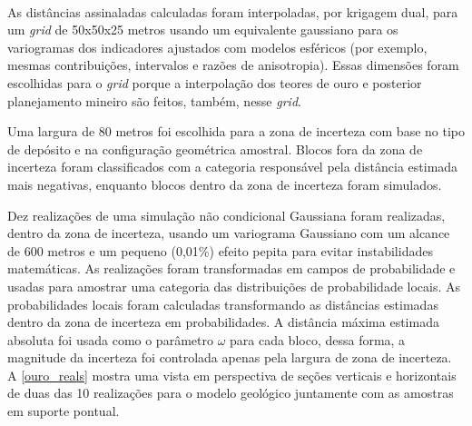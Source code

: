 \begin{figure}[H]
    \hspace{1em}
     \\
\end{figure}

As distâncias assinaladas calculadas foram interpoladas, por krigagem dual, para um \textit{grid} de 50x50x25 metros usando um equivalente gaussiano para os variogramas dos indicadores ajustados com modelos esféricos (por exemplo, mesmas contribuições, intervalos e razões de anisotropia). Essas dimensões foram escolhidas para o \textit{grid} porque a interpolação dos teores de ouro e posterior planejamento mineiro são feitos, também, nesse \textit{grid}.

Uma largura de 80 metros foi escolhida para a zona de incerteza com base no tipo de depósito e na configuração geométrica amostral. Blocos fora da zona de incerteza foram classificados com a categoria responsável pela distância estimada mais negativas, enquanto blocos dentro da zona de incerteza foram simulados.

Dez realizações de uma simulação não condicional Gaussiana foram realizadas, dentro da zona de incerteza, usando um variograma Gaussiano com um alcance de 600 metros e um pequeno (0,01\%) efeito pepita para evitar instabilidades matemáticas. As realizações foram transformadas em campos de probabilidade e usadas para amostrar uma categoria das distribuições de probabilidade locais. As probabilidades locais foram calculadas transformando as distâncias estimadas dentro da zona de incerteza em probabilidades. A distância máxima estimada absoluta foi usada como o parâmetro $\omega$ para cada bloco, dessa forma, a magnitude da incerteza foi controlada apenas pela largura de zona de incerteza. A \autoref{ouro_reals} mostra uma vista em perspectiva de seções verticais e horizontais de duas das 10 realizações para o modelo geológico juntamente com as amostras em suporte pontual.


